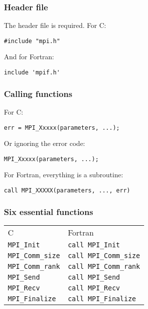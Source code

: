 \begin{frame}[fragile]
  \frametitle{Header file}
  The header file is required. For C:
\begin{lstlisting}[style=c]
#include "mpi.h"
\end{lstlisting}

  And for Fortran:
\begin{lstlisting}[style=fortran]
include 'mpif.h'
\end{lstlisting}
\end{frame}

\begin{frame}[fragile]
  \frametitle{Calling functions}
  For C:
\begin{lstlisting}[style=c,morekeywords={err}]
err = MPI_Xxxxx(parameters, ...);
\end{lstlisting}
  Or ignoring the error code:
\begin{lstlisting}[style=c,morekeywords={err}]
MPI_Xxxxx(parameters, ...);
\end{lstlisting}

  For Fortran, everything is a subroutine:
\begin{lstlisting}[style=fortran,morekeywords={err}]
call MPI_XXXXX(parameters, ..., err)
\end{lstlisting}
\end{frame}

\begin{frame}
  \frametitle{Six essential functions}
  \begin{center}
    \bgroup{}
    \addtolength{\tabcolsep}{0.5cm}
    \begin{tabular}{ll}
      \hline
      C & Fortran  \\
      \hhline{==}
      \texttt{MPI\_Init} & \texttt{call MPI\_Init} \\
      \texttt{MPI\_Comm\_size} & \texttt{call MPI\_Comm\_size} \\
      \texttt{MPI\_Comm\_rank} & \texttt{call MPI\_Comm\_rank} \\
      \texttt{MPI\_Send} & \texttt{call MPI\_Send} \\
      \texttt{MPI\_Recv} & \texttt{call MPI\_Recv} \\
      \texttt{MPI\_Finalize} & \texttt{call MPI\_Finalize} \\
      \hline
    \end{tabular}
    \addtolength{\tabcolsep}{-0.5cm}
    \egroup
  \end{center}
\end{frame}

